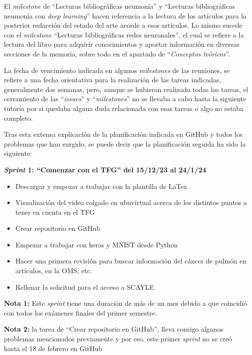 El \textit{milestone} de ``Lecturas bibliográficas neumonía'' y ``Lecturas bibliográficas neumonía con \textit{deep learning}'' hacen referencia a la lectura de los artículos para la posterior redacción del estado del arte acorde a esos artículos. Lo mismo sucede con el \textit{milestone} ``Lecturas bibliográficas redes neuronales'', el cual se refiere a la lectura del libro para adquirir conocimientos y aportar información en diversas secciones de la memoria, sobre todo en el apartado de ``\textit{Conceptos teóricos}''.

La fecha de vencimiento indicada en algunos \textit{milestones} de las reuniones, se refiere a una fecha orientativa para la realización de las tareas indicadas, generalmente dos semanas, pero, aunque se hubieran realizado todas las tareas, el cerramiento de las ``\textit{issues}'' y ``\textit{milestones}'' no se llevaba a cabo hasta la siguiente tutoría por si quedaba alguna duda relacionada con esas tareas o algo no estaba completo.

Tras esta extensa explicación de la planificación indicada en GitHub y todos los problemas que han surgido, se puede decir que la planificación seguida ha sido la siguiente:

\textbf{\textit{Sprint} 1: ``Comenzar con el TFG'' del 15/12/23 al 24/1/24} 
\begin{itemize}
    \item Descargar y empezar a trabajar con la plantilla de LaTex
    \item Visualización del video colgado en ubuvirtual acerca de los distintos puntos a tener en cuenta en el TFG
    \item Crear repositorio en GitHub
    \item Empezar a trabajar con keras y MNIST desde Python
    \item Hacer una primera revisión para buscar información del cáncer de pulmón en artículos, en la OMS, etc.
    \item Rellenar la solicitud para el acceso a SCAYLE
\end{itemize}

\textbf{Nota 1:} Este \textit{sprint} tiene una duración de más de un mes debido a que coincidió con todos los exámenes finales del primer semestre.

\textbf{Nota 2:} la tarea de ``Crear repositorio en GitHub'', lleva consigo algunos problemas mencionados previamente y por eso, este primer \textit{sprint} no se creó hasta el 18 de febrero en GitHub

